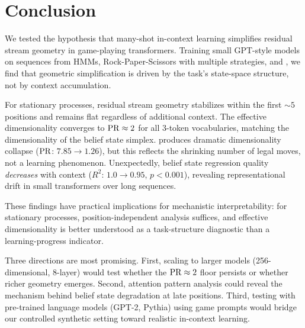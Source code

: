 \section{Conclusion}
\label{sec:conclusion}

We tested the hypothesis that many-shot in-context learning simplifies residual stream geometry in game-playing transformers. Training small GPT-style models on sequences from \messthree HMMs, Rock-Paper-Scissors with multiple strategies, and \ttt, we find that geometric simplification is driven by the task's state-space structure, not by context accumulation.

For stationary processes, residual stream geometry stabilizes within the first ${\sim}5$ positions and remains flat regardless of additional context. The effective dimensionality converges to $\mathrm{PR} \approx 2$ for all 3-token vocabularies, matching the dimensionality of the belief state simplex. \ttt produces dramatic dimensionality collapse ($\mathrm{PR}$: $7.85 \to 1.26$), but this reflects the shrinking number of legal moves, not a learning phenomenon. Unexpectedly, belief state regression quality \emph{decreases} with context ($R^2$: $1.0 \to 0.95$, $p < 0.001$), revealing representational drift in small transformers over long sequences.

These findings have practical implications for mechanistic interpretability: for stationary processes, position-independent analysis suffices, and effective dimensionality is better understood as a task-structure diagnostic than a learning-progress indicator.

Three directions are most promising. First, scaling to larger models (256-dimensional, 8-layer) would test whether the $\mathrm{PR} \approx 2$ floor persists or whether richer geometry emerges. Second, attention pattern analysis could reveal the mechanism behind belief state degradation at late positions. Third, testing with pre-trained language models (\eg GPT-2, Pythia) using game prompts would bridge our controlled synthetic setting toward realistic in-context learning.
